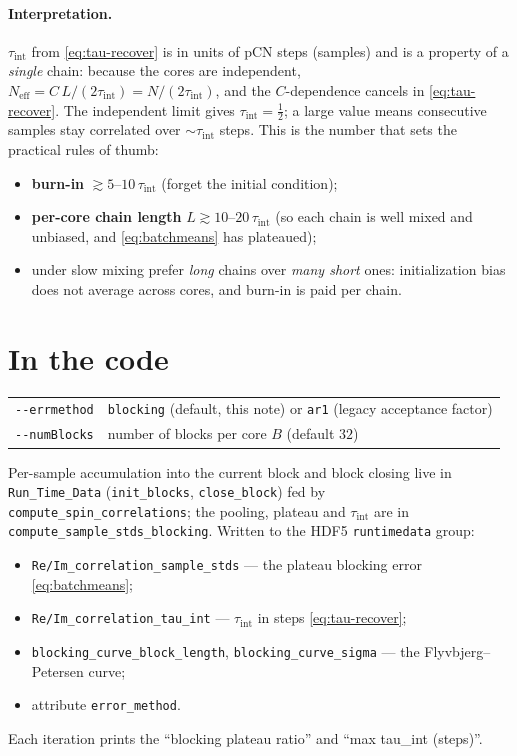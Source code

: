 \documentclass[11pt]{article}
\newcommand{\file}[1]{\texttt{#1}}
\newcommand{\code}[1]{\texttt{#1}}
\newcommand{\tauint}{\tau_{\mathrm{int}}}
\begin{document}
\paragraph{Interpretation.} $\tauint$ from \eqref{eq:tau-recover} is in units of
pCN steps (samples) and is a property of a \emph{single} chain: because the cores
are independent, $N_{\mathrm{eff}} = C\,L/(2\tauint) = N/(2\tauint)$, and the
$C$-dependence cancels in \eqref{eq:tau-recover}. The independent limit gives
$\tauint=\tfrac12$; a large value means consecutive samples stay correlated over
$\sim\tauint$ steps. This is the number that sets the practical rules of thumb:
\begin{itemize}
  \item \textbf{burn-in} $\gtrsim 5$--$10\,\tauint$ (forget the initial condition);
  \item \textbf{per-core chain length} $L \gtrsim 10$--$20\,\tauint$ (so each chain
        is well mixed and unbiased, and \eqref{eq:batchmeans} has plateaued);
  \item under slow mixing prefer \emph{long} chains over \emph{many short} ones:
        initialization bias does not average across cores, and burn-in is paid per
        chain.
\end{itemize}

\section{In the code}

\begin{tabular}{@{}ll@{}}
\code{-{}-errmethod} & \code{blocking} (default, this note) or \code{ar1} (legacy acceptance factor)\\
\code{-{}-numBlocks} & number of blocks per core $B$ (default $32$)\\
\end{tabular}

\medskip
\noindent
Per-sample accumulation into the current block and block closing live in
\file{Run\_Time\_Data} (\code{init\_blocks}, \code{close\_block}) fed by
\code{compute\_spin\_correlations}; the pooling, plateau and $\tauint$ are in
\code{compute\_sample\_stds\_blocking}. Written to the HDF5 \code{runtimedata} group:
\begin{itemize}
  \item \code{Re/Im\_correlation\_sample\_stds} --- the plateau blocking error \eqref{eq:batchmeans};
  \item \code{Re/Im\_correlation\_tau\_int} --- $\tauint$ in steps \eqref{eq:tau-recover};
  \item \code{blocking\_curve\_block\_length}, \code{blocking\_curve\_sigma} --- the Flyvbjerg--Petersen curve;
  \item attribute \code{error\_method}.
\end{itemize}
Each iteration prints the ``blocking plateau ratio'' and ``max tau\_int (steps)''.
\end{document}
